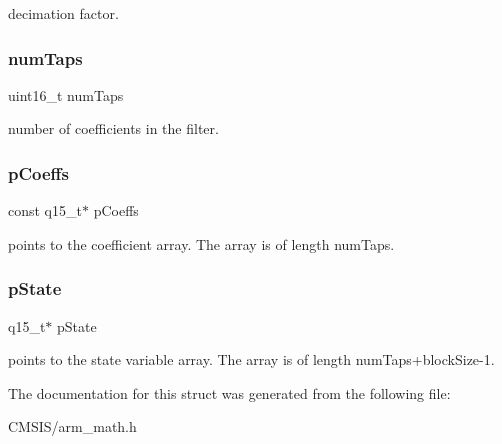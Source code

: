 decimation factor. \mbox{\label{structarm__fir__decimate__instance__q15_a751941891e47f522a7f5375fe8990aac}} 
\subsubsection{\texorpdfstring{numTaps}{numTaps}}
{\footnotesize\ttfamily uint16\+\_\+t num\+Taps}

number of coefficients in the filter. \mbox{\label{structarm__fir__decimate__instance__q15_ae85d417edcdce57e9a54f8c841580578}} 
\subsubsection{\texorpdfstring{pCoeffs}{pCoeffs}}
{\footnotesize\ttfamily const q15\+\_\+t$\ast$ p\+Coeffs}

points to the coefficient array. The array is of length num\+Taps. \mbox{\label{structarm__fir__decimate__instance__q15_ae29dfdb736374fcddaeaec4b7770170c}} 
\subsubsection{\texorpdfstring{pState}{pState}}
{\footnotesize\ttfamily q15\+\_\+t$\ast$ p\+State}

points to the state variable array. The array is of length num\+Taps+block\+Size-\/1. 

The documentation for this struct was generated from the following file\+:\begin{DoxyCompactItemize}
\item 
C\+M\+S\+I\+S/arm\+\_\+math.\+h\end{DoxyCompactItemize}
